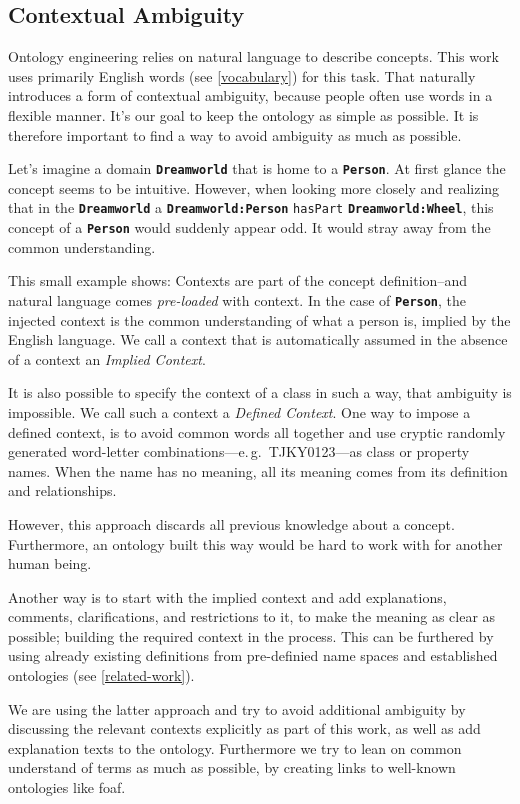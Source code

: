 \documentclass[a4paper, DIV=13, BCOR=0cm]{scrbook}
\newcommand{\eg}{e.\,g.\ }
\newcommand{\class}[1]{\texttt{\textbf{#1}}}
\newcommand{\relation}[1]{\texttt{#1}}
\begin{document}
\subsection{Contextual Ambiguity}
Ontology engineering relies on natural language to describe concepts. This work uses primarily English words (see \autoref{vocabulary}) for this task. That naturally introduces a form of contextual ambiguity, because people often use words in a flexible manner. \cite[p.\,7, 1.5.2]{uschold1998enterprise}  It's our goal to keep the ontology as simple as possible. It is therefore important to find a way to avoid ambiguity as much as possible.

Let's imagine a domain \class{Dreamworld} that is home to a \class{Person}. At first glance the concept seems to be intuitive. However, when looking more closely and realizing that in the \class{Dreamworld} a \class{Dreamworld:Person} \relation{hasPart} \class{Dreamworld:Wheel}, this concept of a \class{Person} would suddenly appear odd. It would stray away from the common understanding.

This small example shows: Contexts are part of the concept definition--and natural language comes \textit{pre-loaded} with context. In the case of \class{Person}, the injected context is the common understanding of what a person is, implied by the English language. We call a context that is automatically assumed in the absence of a context an \textit{Implied Context}.

It is also possible to specify the context of a class in such a way, that ambiguity is impossible. We call such a context a \textit{Defined Context}. One way to impose a defined context, is to avoid common words all together and use cryptic randomly generated word-letter combinations---\eg TJKY0123---as class or property names. When the name has no meaning, all its meaning comes from its definition and relationships.

However, this approach discards all previous knowledge about a concept. Furthermore, an ontology built this way would be hard to work with for another human being.

Another way is to start with the implied context and add explanations, comments, clarifications, and restrictions to it, to make the meaning as clear as possible; building the required context in the process. This can be furthered by using already existing definitions from pre-definied name spaces and established ontologies (see \autoref{related-work}).

We are using the latter approach and try to avoid additional ambiguity by discussing the relevant contexts explicitly as part of this work, as well as add explanation texts to the ontology. Furthermore we try to lean on common understand of terms as much as possible, by creating links to well-known ontologies like \gls{foaf}.
\end{document}
